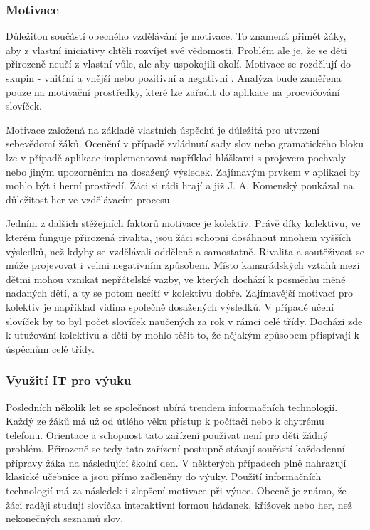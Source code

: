 \documentclass[a4paper,11pt,titlepage,fleqn]{article}
\begin{document}
        \subsubsection{Motivace}
            Důležitou součástí obecného vzdělávání je motivace. To znamená přimět žáky, aby z vlastní iniciativy chtěli rozvíjet své vědomosti. Problém ale je, že se děti přirozeně neučí z vlastní vůle, ale aby uspokojili okolí. Motivace se rozdělují do skupin - vnitřní a vnější nebo pozitivní a negativní \cite{bib:motivace}. Analýza bude zaměřena pouze na motivační prostředky, které lze zařadit do aplikace na procvičování slovíček.

            Motivace založená na základě vlastních úspěchů je důležitá pro utvrzení sebevědomí žáků. Ocenění v případě zvládnutí sady slov nebo gramatického bloku lze v případě aplikace implementovat například hláškami s projevem pochvaly nebo jiným upozorněním na dosažený výsledek. Zajímavým prvkem v aplikaci by mohlo být i herní prostředí. Žáci si rádi hrají a již J. A. Komenský poukázal na důležitost her ve vzdělávacím procesu.


            Jedním z dalších stěžejních faktorů motivace je kolektiv. Právě díky kolektivu, ve kterém funguje přirozená rivalita, jsou žáci schopni dosáhnout mnohem vyšších výsledků, než kdyby se vzdělávali odděleně a samostatně. Rivalita a soutěživost se může projevovat i velmi negativním způsobem. Místo kamarádských vztahů mezi dětmi mohou vznikat nepřátelské vazby, ve kterých dochází k posměchu méně nadaných dětí, a ty se potom necítí v kolektivu dobře. Zajímavější motivací pro kolektiv je například vidina společně dosažených výsledků. V případě učení slovíček by to byl počet slovíček naučených za rok v rámci celé třídy. Dochází zde k utužování kolektivu a děti by mohlo těšit to, že nějakým způsobem přispívají k úspěchům celé třídy.

        \subsubsection{Využití IT pro výuku}
            Posledních několik let se společnost ubírá trendem informačních technologií. Každý ze žáků má už od útlého věku přístup k počítači nebo k chytrému telefonu. Orientace a schopnost tato zařízení používat není pro děti žádný problém. Přirozeně se tedy tato zařízení postupně stávají součástí každodenní přípravy žáka na následující školní den. V některých případech plně nahrazují klasické učebnice a jsou přímo začleněny do výuky. Použití informačních technologií má za následek i zlepšení motivace při výuce. Obecně je známo, že žáci raději studují slovíčka interaktivní formou hádanek, křížovek nebo her, než nekonečných seznamů slov.
\end{document}
